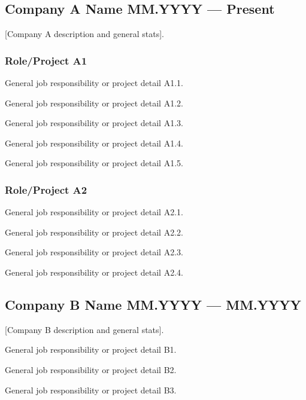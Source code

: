 \subsection{{Company A Name \hfill MM.YYYY --- Present}}

[Company A description and general stats].

\subsubsection{Role/Project A1}
\begin{zitemize}
  \item General job responsibility or project detail A1.1.
  \item General job responsibility or project detail A1.2.
  \item General job responsibility or project detail A1.3.
  \item General job responsibility or project detail A1.4.
  \item General job responsibility or project detail A1.5.
\end{zitemize}

\subsubsection{Role/Project A2}
\begin{zitemize}
  \item General job responsibility or project detail A2.1.
  \item General job responsibility or project detail A2.2.
  \item General job responsibility or project detail A2.3.
  \item General job responsibility or project detail A2.4.
\end{zitemize}

\subsection{{Company B Name \hfill MM.YYYY --- MM.YYYY}}

[Company B description and general stats].

\begin{zitemize}
  \item General job responsibility or project detail B1.
  \item General job responsibility or project detail B2.
  \item General job responsibility or project detail B3.
\end{zitemize}

